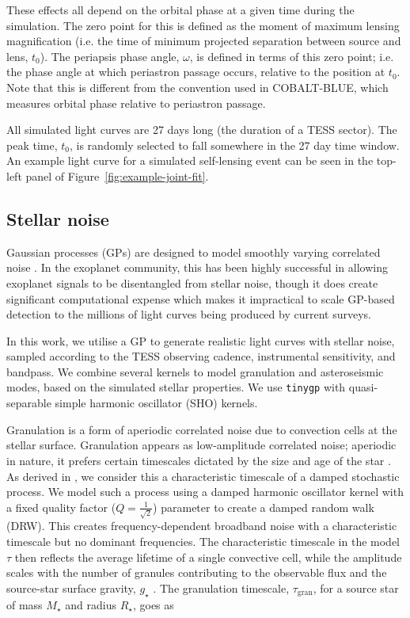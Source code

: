 \documentclass[fleqn,usenatbib]{mnras}
\begin{document}
These effects all depend on the orbital phase at a given time during the simulation. The zero point for this is defined as the moment of maximum lensing magnification (i.e. the time of minimum projected separation between source and lens, $t_0$). The periapsis phase angle, $\omega$, is defined in terms of this zero point; i.e. the phase angle at which periastron passage occurs, relative to the position at $t_0$. Note that this is different from the convention used in COBALT-BLUE, which measures orbital phase relative to periastron passage.

All simulated light curves are 27 days long (the duration of a TESS sector). The peak time, $t_0$, is randomly selected to fall somewhere in the 27 day time window. An example light curve for a simulated self-lensing event can be seen in the top-left panel of Figure~\ref{fig:example-joint-fit}.

\subsection{Stellar noise} \label{sec:gp}


Gaussian processes (GPs) are designed to model smoothly varying correlated noise \citep{rasmussen_gaussian_2005}. In the exoplanet community, this has been highly successful in allowing exoplanet signals to be disentangled from stellar noise, though it does create significant computational expense which makes it impractical to scale GP-based detection to the millions of light curves being produced by current surveys.

In this work, we utilise a GP to generate realistic light curves with stellar noise, sampled according to the TESS observing cadence, instrumental sensitivity, and bandpass. We combine several kernels to model granulation and asteroseismic modes, based on the simulated stellar properties. We use \texttt{tinygp} \citep{foreman-mackey_dfmtinygp_2026} with quasi-separable simple harmonic oscillator (SHO) kernels.

Granulation is a form of aperiodic correlated noise due to convection cells at the stellar surface. Granulation appears as low-amplitude correlated noise; aperiodic in nature, it prefers certain timescales dictated by the size and age of the star \citep{kjeldsen_amplitudes_1995}. As derived
in \cite{foreman-mackey_exoplanet_2021}, we consider this a characteristic timescale of a damped stochastic process. We model such a process using a damped harmonic oscillator kernel with a fixed quality factor ($Q= \frac{1}{\sqrt{2}}$) parameter to create a damped random walk (DRW). This creates frequency-dependent broadband noise with a characteristic timescale but no dominant frequencies. The characteristic
timescale in the model $\tau$ then reflects the average lifetime of a single convective cell, while the amplitude scales with the number of granules contributing to the observable flux and the source-star surface gravity, $g_\star$ \citep{kjeldsen_amplitudes_1995,pereira_gaussian_2019,foreman-mackey_exoplanet_2021}. The granulation timescale,
$\tau_\mathrm{gran}$, for a source star of mass $M_\star$ and radius $R_\star$, goes as
\end{document}
